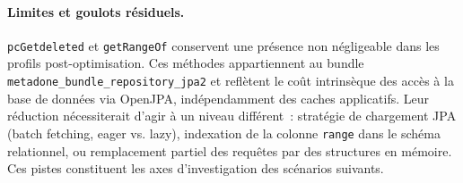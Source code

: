 \paragraph{Limites et goulots résiduels.}
\texttt{pcGetdeleted} et \texttt{getRangeOf} conservent une présence
non négligeable dans les profils post-optimisation. Ces méthodes
appartiennent au bundle \texttt{metadone\_bundle\_repository\_jpa2} et
reflètent le coût intrinsèque des accès à la base de données via OpenJPA,
indépendamment des caches applicatifs. Leur réduction nécessiterait
d'agir à un niveau différent~: stratégie de chargement JPA (batch
fetching, eager vs. lazy), indexation de la colonne \texttt{range} dans
le schéma relationnel, ou remplacement partiel des requêtes par des
structures en mémoire. Ces pistes constituent les axes d'investigation
des scénarios suivants.